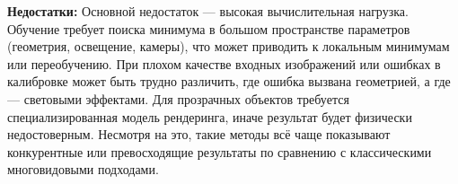 \textbf{Недостатки:} Основной недостаток — высокая вычислительная нагрузка.
Обучение требует поиска минимума в большом пространстве параметров (геометрия,
освещение, камеры), что может приводить к локальным минимумам или переобучению.
При плохом качестве входных изображений или ошибках в калибровке
может быть трудно различить, где ошибка вызвана геометрией, а где — световыми
эффектами. Для прозрачных объектов требуется специализированная модель
рендеринга, иначе результат будет физически недостоверным. Несмотря на это,
такие методы всё чаще показывают конкурентные или превосходящие результаты по
сравнению с классическими многовидовыми подходами.

